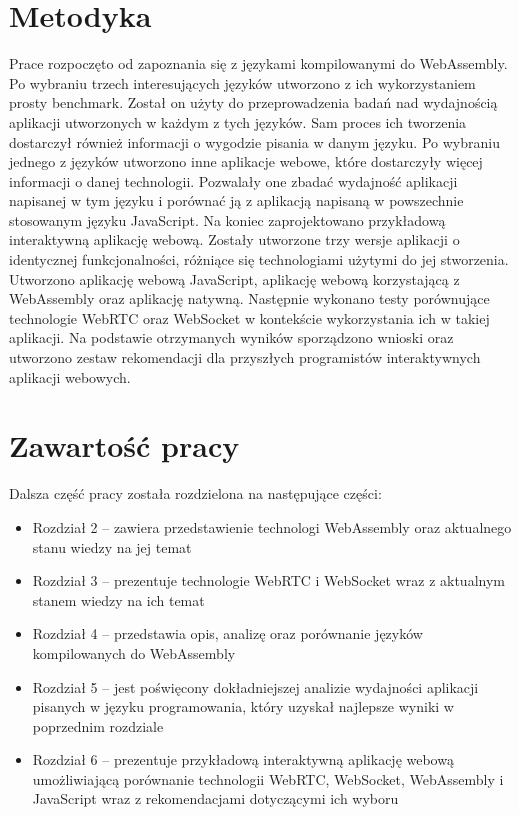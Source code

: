 \documentclass[language=polish,type=master]{aghmodern}
\begin{document}
\section{Metodyka}
Prace rozpoczęto od zapoznania się z językami kompilowanymi do WebAssembly.
Po wybraniu trzech interesujących języków utworzono z ich wykorzystaniem prosty benchmark.
Został on użyty do przeprowadzenia badań nad wydajnością aplikacji utworzonych w każdym z tych języków.
Sam proces ich tworzenia dostarczył również informacji o wygodzie pisania w danym języku.
Po wybraniu jednego z języków utworzono inne aplikacje webowe, które dostarczyły więcej informacji o danej technologii.
Pozwalały one zbadać wydajność aplikacji napisanej w tym języku i porównać ją z aplikacją napisaną w powszechnie stosowanym języku JavaScript.
Na koniec zaprojektowano przykładową interaktywną aplikację webową.
Zostały utworzone trzy wersje aplikacji o identycznej funkcjonalności, różniące się technologiami użytymi do jej stworzenia.
Utworzono aplikację webową JavaScript, aplikację webową korzystającą z WebAssembly oraz aplikację natywną.
Następnie wykonano testy porównujące technologie WebRTC oraz WebSocket w kontekście wykorzystania ich w takiej aplikacji.
Na podstawie otrzymanych wyników sporządzono wnioski oraz utworzono zestaw rekomendacji dla przyszłych programistów interaktywnych aplikacji webowych.

\section{Zawartość pracy}
Dalsza część pracy została rozdzielona na następujące części:

\begin{itemize}
    \item Rozdział 2 -- zawiera przedstawienie technologi WebAssembly oraz aktualnego stanu wiedzy na jej temat
    \item Rozdział 3 -- prezentuje technologie WebRTC i WebSocket wraz z aktualnym stanem wiedzy na ich temat
    \item Rozdział 4 -- przedstawia opis, analizę oraz porównanie języków kompilowanych do WebAssembly
    \item Rozdział 5 -- jest poświęcony dokładniejszej analizie wydajności aplikacji pisanych w języku programowania, który uzyskał najlepsze wyniki w poprzednim rozdziale
    \item Rozdział 6 -- prezentuje przykładową interaktywną aplikację webową umożliwiającą porównanie technologii WebRTC, WebSocket, WebAssembly i JavaScript wraz z rekomendacjami dotyczącymi ich wyboru
\end{itemize}
\end{document}
